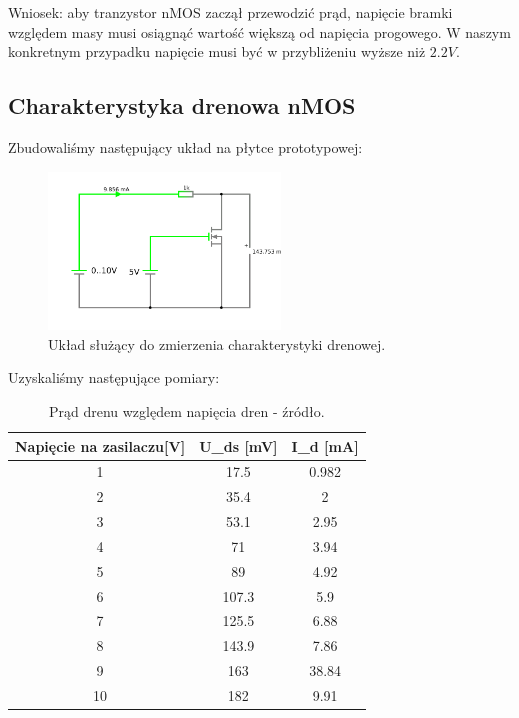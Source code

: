 \documentclass[polish,polish,a4paper]{article}
\begin{document}
Wniosek: aby tranzystor nMOS zaczął przewodzić prąd, napięcie bramki względem masy musi osiągnąć wartość większą od napięcia progowego. \cite{proste} W naszym konkretnym przypadku napięcie musi być w przybliżeniu wyższe niż $2.2V$.


\subsection{Charakterystyka drenowa nMOS}

Zbudowaliśmy następujący układ na płytce prototypowej:

\begin{figure}[H]
\centering
\includegraphics[width=0.55\textwidth]{nmos drenowa.pdf}
\caption{Układ służący do zmierzenia charakterystyki drenowej.}
\end{figure}

Uzyskaliśmy następujące pomiary:

\begin{table}[H]
\centering
\begin{tabular}{|c|c|c|}
\hline
Napięcie na zasilaczu[V] & U\_ds [mV] & I\_d [mA] \\
\hline
1&17.5 & 0.982 \\
\hline
2 &35.4 & 2 \\
\hline
3 &53.1 & 2.95 \\
\hline
4 &71 & 3.94 \\
\hline
5 &89 & 4.92 \\
\hline
6 &107.3 & 5.9 \\
\hline
7 &125.5 & 6.88 \\
\hline
8 &143.9 & 7.86 \\
\hline
9 &163 & 38.84 \\
\hline
10 &182 & 9.91 \\
\hline
\end{tabular}
\caption{Prąd drenu względem napięcia dren - źródło.}
\end{table}
\end{document}
